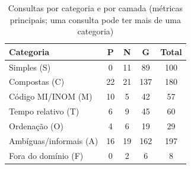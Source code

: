 \begin{table}[htbp!]
\centering
\caption{Consultas por categoria e por camada (métricas principais; uma consulta pode ter mais de uma categoria)}
\label{tab:dataset-categorias}
\small
\begin{tabular}{|l|c|c|c|c|}
\hline
\textbf{Categoria} & \textbf{P} & \textbf{N} & \textbf{G} & \textbf{Total} \\
\hline
Simples (S) & 0 & 11 & 89 & 100 \\
Compostas (C) & 22 & 21 & 137 & 180 \\
Código MI/INOM (M) & 10 & 5 & 42 & 57 \\
Tempo relativo (T) & 6 & 9 & 45 & 60 \\
Ordenação (O) & 4 & 6 & 19 & 29 \\
Ambíguas/informais (A) & 16 & 19 & 162 & 197 \\
Fora do domínio (F) & 0 & 2 & 6 & 8 \\
\hline
\end{tabular}
\end{table}
